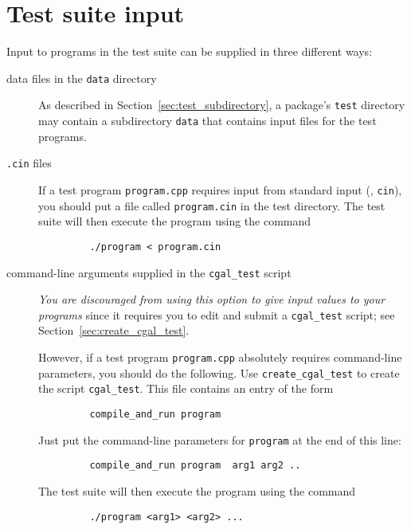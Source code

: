 \section{Test suite input\label{sec:test_suite_input}}

Input to programs in the test suite can be supplied in three different
ways:
\begin{description}
   \item[data files in the {\tt data} directory]
         As described in Section~\ref{sec:test_subdirectory}, a package's
         {\tt test} directory may contain a subdirectory {\tt data} that
         contains input files for the test programs.
   \item[{\tt *.cin} files]
         If a test program \texttt{program.cpp} requires input from standard 
         input (\ie, {\tt cin}), you should put a file called 
         \texttt{program.cin} in the test directory. 
         The test suite will then execute the program using the command
         \begin{verbatim}
         ./program < program.cin
         \end{verbatim}
   \item[command-line arguments supplied in the {\tt cgal\_test} script]
        {\em You are discouraged from using this option to give input values
        to your programs} since it requires you to edit and submit a 
        {\tt cgal\_test} script; see Section~\ref{sec:create_cgal_test}.

         However, if a test program \texttt{program.cpp} absolutely requires 
         command-line parameters, you should do the following. Use
         \texttt{create\_cgal\_test} to create the script \texttt{cgal\_test}.
         This file contains an entry of the form 
         \begin{verbatim}
         compile_and_run program 
         \end{verbatim}
         Just put the command-line 
         parameters for \texttt{program} at the end of this line: 
         \begin{verbatim}
         compile_and_run program  arg1 arg2 ..
         \end{verbatim}
         The test suite will then execute the program using the command

         \begin{verbatim}
         ./program <arg1> <arg2> ...
         \end{verbatim}
\end{description}


